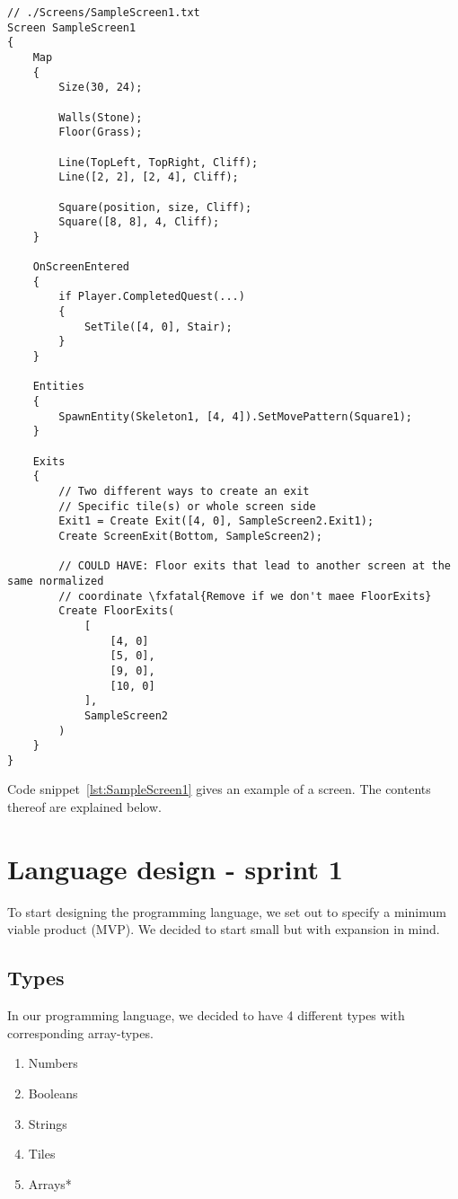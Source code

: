 \begin{lstlisting}[caption={Example screen}, label={lst:SampleScreen1},escapechar=|]
// ./Screens/SampleScreen1.txt
Screen SampleScreen1 
{
    Map 
    {
        Size(30, 24);

        Walls(Stone); 
        Floor(Grass);

        Line(TopLeft, TopRight, Cliff);
        Line([2, 2], [2, 4], Cliff);

        Square(position, size, Cliff);
        Square([8, 8], 4, Cliff);
    }

    OnScreenEntered
    {
        if Player.CompletedQuest(...) 
        {
            SetTile([4, 0], Stair);
        }
    }

    Entities
    {
        SpawnEntity(Skeleton1, [4, 4]).SetMovePattern(Square1);
    }
    
    Exits 
    {
        // Two different ways to create an exit
        // Specific tile(s) or whole screen side
        Exit1 = Create Exit([4, 0], SampleScreen2.Exit1);
        Create ScreenExit(Bottom, SampleScreen2);
    
        // COULD HAVE: Floor exits that lead to another screen at the same normalized 
        // coordinate \fxfatal{Remove if we don't maee FloorExits}
        Create FloorExits(  
            [ 
                [4, 0] 
                [5, 0], 
                [9, 0], 
                [10, 0] 
            ],
            SampleScreen2
        )
    }
}
\end{lstlisting}

Code snippet~\ref{lst:SampleScreen1} gives an example of a screen. The contents thereof are explained below.

\section{Language design - sprint 1}

To start designing the programming language, we set out to specify a minimum viable product (MVP). We decided to start small but with expansion in mind.

\subsection{Types}
In our programming language, we decided to have 4 different types with corresponding array-types.

\begin{multicols}{3}
\begin{enumerate}
    \item Numbers\label{item:numbertype}
    \item Booleans\label{item:booleantype}
    \item Strings\label{item:stringtype}
    \item Tiles\label{item:tiletype}
    \item Arrays*\label{item:arraytype}
\end{enumerate}
\end{multicols}

